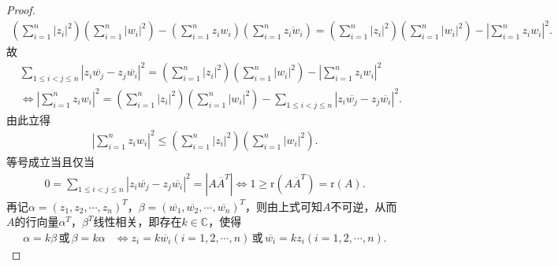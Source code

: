 \documentclass[../../main.tex]{subfiles}%
\begin{document}
\begin{proof}
\begin{align*}
\left( \sum_{i=1}^n{|z_i|^2} \right) \left( \sum_{i=1}^n{|w_i|^2} \right) -\left( \sum_{i=1}^n{z_iw_i} \right) \left( \sum_{i=1}^n{\overline{z_iw_i}} \right)
=\left( \sum_{i=1}^n{|z_i|^2} \right) \left( \sum_{i=1}^n{|w_i|^2} \right) -\left| \sum_{i=1}^n{z_iw_i} \right|^2.
\end{align*}
故
\begin{align*}
&\sum_{1\leqslant i<j\leqslant n}{\left| z_i\overline{w_j}-z_j\overline{w_i} \right|^2}=\left( \sum_{i=1}^n{|z_i|^2} \right) \left( \sum_{i=1}^n{|w_i|^2} \right) -\left| \sum_{i=1}^n{z_iw_i} \right|^2\\
&\Longleftrightarrow \left| \sum_{i=1}^n{z_iw_i} \right|^2=\left( \sum_{i=1}^n{|z_i|^2} \right) \left( \sum_{i=1}^n{|w_i|^2} \right) -\sum_{1\leqslant i<j\leqslant n}{\left| z_i\overline{w_j}-z_j\overline{w_i} \right|^2}.
\end{align*}
由此立得
\begin{align*}
\left| \sum_{i=1}^n{z_iw_i} \right|^2\leqslant \left( \sum_{i=1}^n{|z_i|^2} \right) \left( \sum_{i=1}^n{|w_i|^2} \right) .
\end{align*}
等号成立当且仅当
\begin{align*}
0=\sum_{1\leqslant i<j\leqslant n}{\left| z_i\overline{w_j}-z_j\overline{w_i} \right|^2}=\left| A\overline{A}^T \right|
\Longleftrightarrow 1\geqslant \mathrm{r}\left( A\overline{A}^T \right) =\mathrm{r}\left( A \right) .
\end{align*}
再记$\alpha =\left( z_1,z_2,\cdots ,z_n \right) ^T$，$\beta =\left( \overline{w_1},\overline{w_2},\cdots ,\overline{w_n} \right) ^T$，则由上式可知$A$不可逆，从而$A$的行向量$\alpha ^T$，$\beta ^T$线性相关，即存在$k\in \mathbb{C}$，使得
\begin{align*}
\alpha =k\beta \, \text{或} \, \beta =k\alpha
&\Longleftrightarrow z_i=k\overline{w_i}\left( i=1,2,\cdots ,n \right) \, \text{或} \, \overline{w_i}=kz_i\left( i=1,2,\cdots ,n \right) .
\end{align*}


\end{proof}
\end{document}
